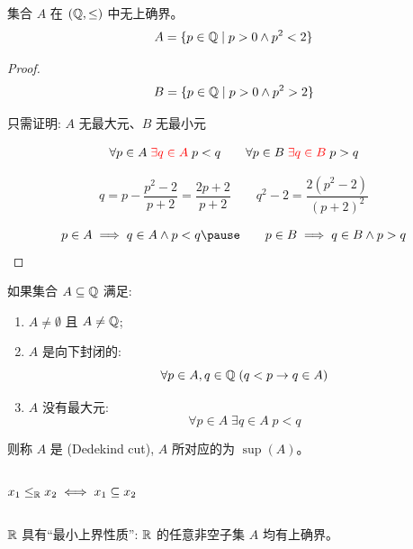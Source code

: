 \begin{frame}{}
  \begin{theorem}
    集合 $A$ 在 $(\mathbb{Q}, \le)$ 中无上确界。
    \[
      A = \{p \in \mathbb{Q} \mid p > 0 \land p^2 < 2\}
    \]
  \end{theorem}

  \pause
  \begin{proof}
    \[
      B = \{p \in \mathbb{Q} \mid p > 0 \land p^2 > 2\}
    \]

    \pause
    \begin{center}
      只需证明: $A$ 无最大元、$B$ 无最小元
    \end{center}

    \pause
    \[
      \forall p \in A\; \textcolor{red}{\exists q \in A}\; p < q
      \qquad
      \forall p \in B\; \textcolor{red}{\exists q \in B}\; p > q
    \]

    \pause
    \[
      q = p - \frac{p^2 - 2}{p + 2} = \frac{2p + 2}{p + 2}
      \qquad
      q^2 - 2 = \frac{2(p^2 -2)}{(p + 2)^2}
    \]

    \pause
    \[
      p \in A \implies q \in A \land p < q
      \pause \qquad
      p \in B \implies q \in B \land p > q
    \]
  \end{proof}
\end{frame}

\begin{frame}{}
  \begin{definition}[实数 ($\R$)]
    如果集合 $A \subseteq \mathbb{Q}$ 满足:
    \begin{enumerate}[(1)]
      \item $A \neq \emptyset$ 且 $A \neq \mathbb{Q}$;
      \item $A$ 是向下封闭的:
        \[
          \forall p \in A, q \in \mathbb{Q}\; (q < p \to q \in A)
        \]
      \item $A$ 没有最大元:
        \[
          \forall p \in A\; \exists q \in A\; p < q
        \]
    \end{enumerate}
    则称 $A$ 是 (Dedekind cut),
    $A$ 所对应的为 $\sup(A)$。
  \end{definition}

  \begin{columns}
      \pause
      \begin{definition}[$\le_{\R}$]
        $x_{1} \le_{\mathbb{R}} x_{2} \iff x_{1} \subseteq x_{2}$
      \end{definition}
  \end{columns}

  \pause
  \begin{theorem}
    $\R$ 具有``最小上界性质'':
    $\R$ 的任意非空子集 $A$ 均有上确界。
  \end{theorem}
\end{frame}
